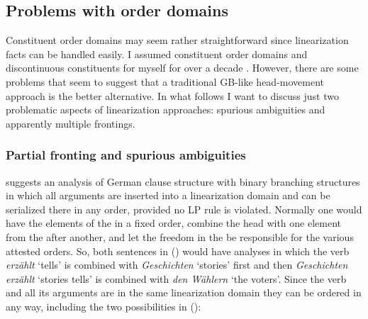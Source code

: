 \documentclass[output=paper,biblatex,babelshorthands,newtxmath,draftmode,colorlinks,citecolor=brown]{langscibook}
\begin{document}
\subsection{Problems with order domains}
\label{sec-problems-dom}

Constituent order domains may seem rather straightforward since linearization facts can be handled
easily. I assumed constituent order domains and discontinuous constituents for  myself for
over a decade \citep{Mueller95c,Mueller2004b}. However, there are some problems that seem to suggest
that a traditional GB-like head-movement approach is the better alternative. In what follows I want
to discuss just two problematic aspects of linearization approaches: spurious ambiguities and
apparently multiple frontings.

\subsubsection{Partial fronting and spurious ambiguities}

\citet{Kathol2000a} suggests an analysis of German clause structure with binary branching structures
in which all arguments are inserted into a linearization domain and can be serialized there in any
order, provided no LP rule is violated. Normally one would have the elements of the \compsl in a
fixed order, combine the head with one element from the \compsl after another, and let the freedom
in the \doml be responsible for the various attested orders. So, both sentences in () would
have analyses in which the verb \emph{erzählt} `tells' is combined with \emph{Geschichten} `stories'
first and then \emph{Geschichten erzählt} `stories tells' is combined with \emph{den Wählern} `the
voters'. Since the verb and all its arguments are in the same linearization domain they can be
ordered in any way, including the two possibilities in ():
\end{document}
